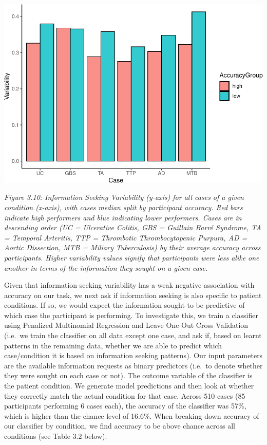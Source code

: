 \documentclass[a4paper, nobind]{templates/ociamthesis}
\begin{document}
\newpage

\begin{center}\includegraphics[width=1\linewidth]{_main_files/figure-latex/accVarSplitPlot-1} \end{center}

\emph{Figure 3.10: Information Seeking Variability (y-axis) for all cases of a given condition (x-axis), with cases median split by participant accuracy. Red bars indicate high performers and blue indicating lower performers. Cases are in descending order (UC = Ulcerative Colitis, GBS = Guillain Barré Syndrome, TA = Temporal Arteritis, TTP = Thrombotic Thrombocytopenic Purpura, AD = Aortic Dissection, MTB = Miliary Tuberculosis) by their average accuracy across participants. Higher variability values signify that participants were less alike one another in terms of the information they sought on a given case.}

\hfill\break

Given that information seeking variability has a weak negative association with accuracy on our task, we next ask if information seeking is also specific to patient conditions. If so, we would expect the information sought to be predictive of which case the participant is performing. To investigate this, we train a classifier using Penalized Multinomial Regression and Leave One Out Cross Validation (i.e.~we train the classifier on all data except one case, and ask if, based on learnt patterns in the remaining data, whether we are able to predict which case/condition it is based on information seeking patterns). Our input parameters are the available information requests as binary predictors (i.e.~to denote whether they were sought on each case or not). The outcome variable of the classifier is the patient condition. We generate model predictions and then look at whether they correctly match the actual condition for that case. Across 510 cases (85 participants performing 6 cases each), the accuracy of the classifier was 57\%, which is higher than the chance level of 16.6\%. When breaking down accuracy of our classifier by condition, we find accuracy to be above chance across all conditions (see Table 3.2 below).
\end{document}

